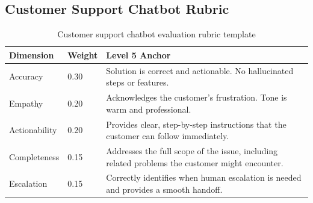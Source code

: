 \subsection{Customer Support Chatbot Rubric}

\begin{table}[htbp]
\centering
\caption{Customer support chatbot evaluation rubric template}
\label{tab:cs-rubric}
\begin{tabularx}{\textwidth}{p{2cm}p{1cm}X}
\toprule
\textbf{Dimension} & \textbf{Weight} & \textbf{Level 5 Anchor} \\
\midrule
Accuracy & 0.30 & Solution is correct and actionable. No hallucinated steps or features. \\
Empathy & 0.20 & Acknowledges the customer's frustration. Tone is warm and professional. \\
Actionability & 0.20 & Provides clear, step-by-step instructions that the customer can follow immediately. \\
Completeness & 0.15 & Addresses the full scope of the issue, including related problems the customer might encounter. \\
Escalation & 0.15 & Correctly identifies when human escalation is needed and provides a smooth handoff. \\
\bottomrule
\end{tabularx}
\end{table}
